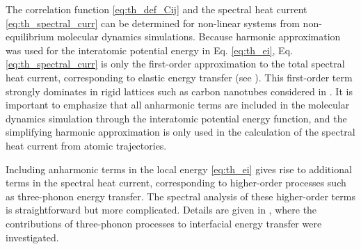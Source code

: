 The correlation function \eqref{eq:th_def_Cij} and the spectral heat current \eqref{eq:th_spectral_curr} can be determined for non-linear systems from non-equilibrium molecular dynamics simulations. Because harmonic approximation was used for the interatomic potential energy in Eq. \eqref{eq:th_ei}, Eq. \eqref{eq:th_spectral_curr} is only the first-order approximation to the total spectral heat current, corresponding to elastic energy transfer (see ). This first-order term strongly dominates in rigid lattices such as carbon nanotubes considered in . It is important to emphasize that all anharmonic terms are included in the molecular dynamics simulation through the interatomic potential energy function, and the simplifying harmonic approximation is only used in the calculation of the spectral heat current from atomic trajectories. %

Including anharmonic terms in the local energy \eqref{eq:th_ei} gives rise to additional terms in the spectral heat current, corresponding to higher-order processes such as three-phonon energy transfer. The spectral analysis of these higher-order terms is straightforward but more complicated. Details are given in , where the contributions of three-phonon processes to interfacial energy transfer were investigated. 









